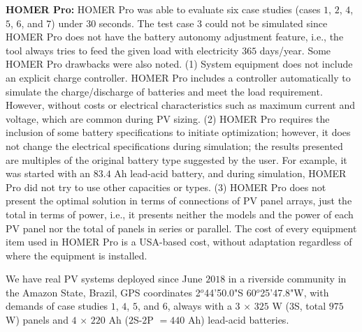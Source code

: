 \documentclass[journal]{IEEEtran}
\begin{document}
\textbf{HOMER Pro:} HOMER Pro was able to evaluate six case studies (cases $1$, $2$, $4$, $5$, $6$, and $7$) under $30$ seconds. The test case $3$ could not be simulated since HOMER Pro does not have the battery autonomy adjustment feature, i.e., the tool always tries to feed the given load with electricity $365$ days/year. Some HOMER Pro drawbacks were also noted. (1) System equipment does not include an explicit charge controller. HOMER Pro includes a controller automatically to simulate the charge/discharge of batteries and meet the load requirement. However, without costs or electrical characteristics such as maximum current and voltage, which are common during PV sizing. (2) HOMER Pro requires the inclusion of some battery specifications to initiate optimization; however, it does not change the electrical specifications during simulation; the results presented are multiples of the original battery type suggested by the user. For example, it was started with an $83.4$ Ah lead-acid battery, and during simulation, HOMER Pro did not try to use other capacities or types. (3) HOMER Pro does not present the optimal solution in terms of connections of PV panel arrays, just the total in terms of power, i.e., it presents neither the models and the power of each PV panel nor the total of panels in series or parallel. The cost of every equipment item used in HOMER Pro is a USA-based cost, without adaptation regardless of where the equipment is installed.

We have real PV systems deployed since June $2018$ in a riverside community in the Amazon State, Brazil, GPS coordinates 2$^{o}$44'50.0"S 60$^{o}$25'47.8"W, with demands of case studies $1$, $4$, $5$, and $6$, always with a $3$ $\times$ $325$ W ($3$S, total $975$ W) panels and $4$ $\times$ $220$ Ah ($2$S-$2$P $= 440$ Ah) lead-acid batteries.
\end{document}

